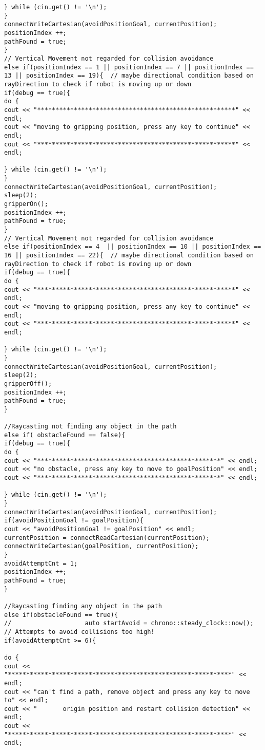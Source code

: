 \begin{lstlisting}[frame = single, label={lst:cppread1}]
} while (cin.get() != '\n');
}
connectWriteCartesian(avoidPositionGoal, currentPosition);
positionIndex ++;
pathFound = true;
}
// Vertical Movement not regarded for collision avoidance
else if(positionIndex == 1 || positionIndex == 7 || positionIndex == 13 || positionIndex == 19){  // maybe directional condition based on rayDirection to check if robot is moving up or down
if(debug == true){
do {
cout << "******************************************************" << endl;
cout << "moving to gripping position, press any key to continue" << endl;
cout << "******************************************************" << endl;

} while (cin.get() != '\n');
}
connectWriteCartesian(avoidPositionGoal, currentPosition);
sleep(2);
gripperOn();
positionIndex ++;
pathFound = true;
}
// Vertical Movement not regarded for collision avoidance
else if(positionIndex == 4  || positionIndex == 10 || positionIndex == 16 || positionIndex == 22){  // maybe directional condition based on rayDirection to check if robot is moving up or down
if(debug == true){
do {
cout << "******************************************************" << endl;
cout << "moving to gripping position, press any key to continue" << endl;
cout << "******************************************************" << endl;

} while (cin.get() != '\n');
}
connectWriteCartesian(avoidPositionGoal, currentPosition);
sleep(2);
gripperOff();
positionIndex ++;
pathFound = true;
}

//Raycasting not finding any object in the path
else if( obstacleFound == false){
if(debug == true){
do {
cout << "**************************************************" << endl;
cout << "no obstacle, press any key to move to goalPosition" << endl;
cout << "**************************************************" << endl;

} while (cin.get() != '\n');
}
connectWriteCartesian(avoidPositionGoal, currentPosition);
if(avoidPositionGoal != goalPosition){
cout << "avoidPositionGoal != goalPosition" << endl;
currentPosition = connectReadCartesian(currentPosition);
connectWriteCartesian(goalPosition, currentPosition);
}
avoidAttemptCnt = 1;
positionIndex ++;
pathFound = true;
}

//Raycasting finding any object in the path
else if(obstacleFound == true){
//                    auto startAvoid = chrono::steady_clock::now();
// Attempts to avoid collisions too high!
if(avoidAttemptCnt >= 6){

do {
cout << "*************************************************************" << endl;
cout << "can't find a path, remove object and press any key to move to" << endl;
cout << "       origin position and restart collision detection" << endl;
cout << "*************************************************************" << endl;


\end{lstlisting}
